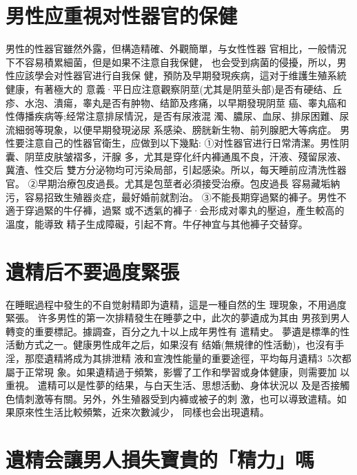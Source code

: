 \documentclass[12pt,UTF8]{ctexbook}
\begin{document}
\section{男性应重視对性器官的保健}

男性的性器官雖然外露，但構造精確、外觀簡單，与女性性器
官相比，一般情況下不容易積累細菌，但是如果不注意自我保健，
也会受到病菌的侵擾，所以，男性应該學会对性器官进行自我保
健，預防及早期發現疾病，這对于维護生殖系統健康，有著極大的
意義·平日应注意觀察阴莖(尤其是阴莖头部)是否有硬结、丘
疹、水泡、潰瘍，睾丸是否有肿物、结節及疼痛，以早期發現阴莖
癌、睾丸癌和性傳播疾病等;经常注意排尿情況，是否有尿液混
濁、膿尿、血尿、排尿困難、尿流細弱等現象，以便早期發現泌尿
系感染、膀胱新生物、前列腺肥大等病症。
男性要注意自己的性器官衛生，应做到以下幾點:
①对性器官进行日常清潔。男性阴囊、阴莖皮肤皱褶多，汗腺
多，尤其是穿化纤内褲通風不良，汗液、殘留尿液、冀渣、性交后
雙方分泌物均可污染局部，引起感染。所以，每天睡前应清洗性器
官。
②早期治療包皮過長。尤其是包莖者必須接受治療。包皮過長
容易藏垢納污，容易招致生殖器炎症，最好婚前就割治。
③不能長期穿過緊的褲子。男性不適于穿過緊的牛仔褲，過緊
或不透氣的褲子·会形成对睾丸的壓迫，產生較高的溫度，能導致
精子生成障礙，引起不育。牛仔神宜与其他褲子交替穿。

\section{遺精后不要過度緊張}

在睡眠過程中發生的不自觉射精即为遺精，這是一種自然的生
理現象，不用過度緊張。
许多男性的第一次排精發生在睡夢之中，此次的夢遺成为其由
男孩到男人轉变的重要標記。據調查，百分之九十以上成年男性有
遣精史。
夢遺是標準的性活動方式之一。健康男性成年之后，如果沒有
结婚(無規律的性活動)，也沒有手淫，那麼遺精將成为其排泄精
液和宣洩性能量的重要途徑，平均每月遺精3~5次都屬于正常現
象。如果遺精過于頻繁，影響了工作和學習或身体健康，则需要加
以重視。
遣精可以是性夢的结果，与白天生活、思想活動、身体状況以
及是否接觸色情刺激等有關。另外，外生殖器受到内褲或被子的刺
激，也可以導致遣精。如果原來性生活比較頻繁，近來次數減少，
同樣也会出現遺精。

\section{遺精会讓男人損失寶貴的「精力」嗎}
\end{document}
